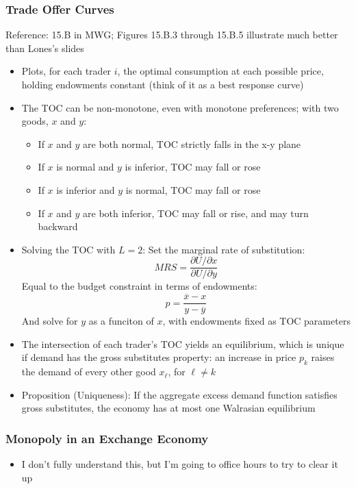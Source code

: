 \documentclass{article}
\newcommand{\olx}{\overline{x}}
\newcommand{\oly}{\overline{y}}
\newcommand{\red}[1]{{\color{red}#1}}
\newcommand{\blue}[1]{{\color{blue}#1}}
\begin{document}
\subsubsection{Trade Offer Curves}
\red{Reference: 15.B in MWG; Figures 15.B.3 through 15.B.5 illustrate much better than Lones's slides}
\begin{itemize}
	\item Plots, for each trader $i$, the optimal consumption at each possible price, holding endowments constant (think of it as a best response curve)
	\item The TOC can be non-monotone, even with monotone preferences; with two goods, $x$ and $y$:
		\begin{itemize}
			\item If $x$ and $y$ are both normal, TOC strictly falls in the x-y plane
			\item If $x$ is normal and $y$ is inferior, TOC may fall or rose
			\item If $x$ is inferior and $y$ is normal, TOC may fall or rose
			\item If $x$ and $y$ are both inferior, TOC may fall or rise, and may turn backward
		\end{itemize}
	\item \blue{Solving the TOC with $L=2$:} Set the marginal rate of substitution: 
		\[
			MRS = \frac{\partial U/\partial x}{\partial U/\partial y}
		\]
		Equal to the budget constraint in terms of endowments:
		\[
			p = \frac{\olx - x}{y-\oly}
		\]
		And solve for $y$ as a funciton of $x$, with endowments fixed as TOC parameters
	\item The intersection of each trader's TOC yields an equilibrium, which is unique if demand has the \blue{gross substitutes property}: an increase in price $p_k$ raises the demand of every other good $x_\ell$, for $\ell\neq k$
	\item \blue{Proposition (Uniqueness):} If the aggregate excess demand function satisfies gross substitutes, the economy has at most one Walrasian equilibrium
\end{itemize}

\subsubsection{Monopoly in an Exchange Economy}
\begin{itemize}
	\item \red{I don't fully understand this, but I'm going to office hours to try to clear it up}
\end{itemize}
\end{document}

